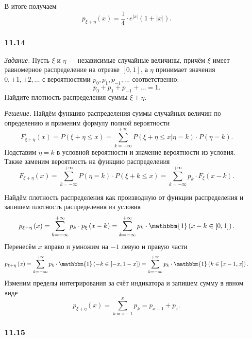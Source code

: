 В итоге получаем
$$p_{ \xi + \eta } \left( x \right) =
\frac{1}{4} \cdot e^{ \left| x \right| } \left( 1 + \left| x \right| \right).$$

\subsubsection*{11.14}

\textit{Задание.}
Пусть $ \xi $ и $ \eta $ --- независимые случайные величины,
причём $ \xi $ имеет равномерное распределение на отрезке $ \left[ 0, 1 \right] $,
а $ \eta $ принимает значения $0, \pm 1, \pm 2, \dotsc $ с вероятностями $p_0, p_1, p_{-1}, \dotsc $ соответственно:
$$p_0 + p_1 + p_{-1} + \dotsc =
1.$$
Найдите плотность распределения суммы $ \xi + \eta $.

\textit{Решение.} Найдём функцию распределения суммы случайных величин по определению и применим формулу полной вероятности
$$F_{ \xi + \eta } \left( x \right) =
P \left( \xi + \eta \leq x \right) =
\sum \limits_{k = - \infty }^{+ \infty } P \left( \left. \xi + \eta \leq x \right| \eta = k \right) \cdot P \left( \eta = k \right).$$
Подставим $ \eta = k$ в условной вероятности и значение вероятности из условия.
Также заменим вероятность на функцию распределения
$$F_{ \xi + \eta } \left( x \right) =
\sum \limits_{k = - \infty }^{+ \infty } P \left( \eta = k \right) \cdot P \left( \xi + k \leq x \right) =
\sum \limits_{k = - \infty }^{+ \infty } p_k \cdot F_{ \xi } \left( x-k \right).$$

Найдём плотность распределения как производную от функции распределения и запишем плотность распределения из условия
$$p_{ \xi + \eta } \left( x \right) =
\sum \limits_{k = - \infty }^{+ \infty } p_k \cdot p_{ \xi } \left( x-k \right) =
\sum \limits_{k = - \infty }^{+ \infty } p_k \cdot \mathbbm{1} \left( x-k \in \left[ 0, 1 \right] \right).$$
Перенесём $x$ вправо и умножим на $-1$ левую и правую части
$$p_{ \xi + \eta } \left( x \right) =
\sum \limits_{k = - \infty }^{+ \infty } p_k \cdot \mathbbm{1} \left( -k \in \left[ -x, 1-x \right] \right) =
\sum \limits_{k = - \infty }^{+ \infty } p_k \cdot \mathbbm{1} \left( k \in \left[ x-1, x \right] \right).$$
Изменим пределы интегрирования за счёт индикатора и запишем сумму в явном виде
$$p_{ \xi + \eta } \left( x \right) =
\sum \limits_{k =x-1}^{x} p_k =
p_{x-1} + p_x.$$

\subsubsection*{11.15}

